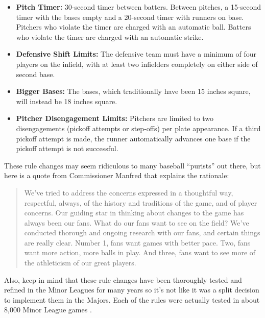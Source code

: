 \documentclass[12pt]{article}
\begin{document}
\begin{itemize}
  \item \textbf{Pitch Timer:} 30-second timer between batters. Between pitches,
  a 15-second timer with the bases empty and a 20-second timer with runners on base.
  Pitchers who violate the timer are charged with an automatic ball.
  Batters who violate the timer are charged with an automatic strike.

  \item \textbf{Defensive Shift Limits:} The defensive team must have a minimum
  of four players on the infield, with at least two infielders completely on either
  side of second base.

  \item \textbf{Bigger Bases:} The bases, which traditionally have been 15 inches
  square, will instead be 18 inches square.

  \item \textbf{Pitcher Disengagement Limits:} Pitchers are limited to two
  disengagements (pickoff attempts or step-offs) per plate appearance. If a third
  pickoff attempt is made, the runner automatically advances one base if the 
  pickoff attempt is not successful.
\end{itemize}

These rule changes may seem ridiculous to many baseball ``purists'' out there,
but here is a quote from Commissioner Manfred that explains the rationale:

\begin{quote}
  We've tried to address the concerns expressed in a thoughtful way, respectful,
  always, of the history and traditions of the game, and of player concerns. Our
  guiding star in thinking about changes to the game has always been our fans.
  What do our fans want to see on the field? We've conducted thorough and ongoing
  research with our fans, and certain things are really clear. Number 1, fans want
  games with better pace. Two, fans want more action, more balls in play. And three,
  fans want to see more of the athleticism of our great players.
\end{quote}

Also, keep in mind that these rule changes have been thoroughly tested and refined
in the Minor Leagues for many years so it's not like it was a split decision to
implement them in the Majors. Each of the rules were actually tested in about 8,000
Minor League games \citep{Castrovince}.
\end{document}
